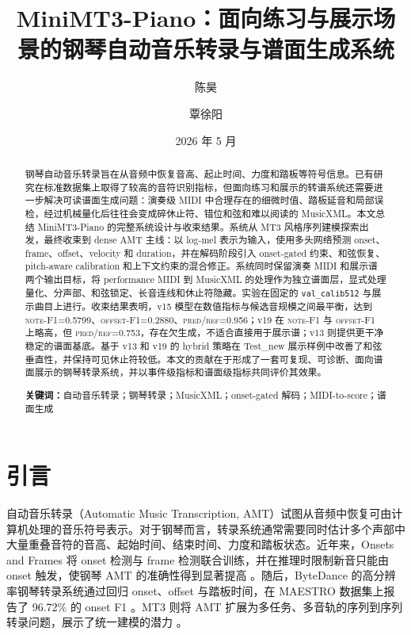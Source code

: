 \documentclass[UTF8,a4paper,zihao=-4]{ctexart}
\title{\textbf{MiniMT3-Piano：面向练习与展示场景的钢琴自动音乐转录与谱面生成系统}}
\author{陈昊 \and 覃徐阳}
\date{2026 年 5 月}
\newcommand{\code}[1]{\texttt{#1}}
\newcommand{\metric}[1]{\textsc{#1}}
\begin{document}
\maketitle

\begin{abstract}
钢琴自动音乐转录旨在从音频中恢复音高、起止时间、力度和踏板等符号信息。已有研究在标准数据集上取得了较高的音符识别指标，但面向练习和展示的转谱系统还需要进一步解决可读谱面生成问题：演奏级 MIDI 中合理存在的细微时值、踏板延音和局部误检，经过机械量化后往往会变成碎休止符、错位和弦和难以阅读的 MusicXML。本文总结 MiniMT3-Piano 的完整系统设计与收束结果。系统从 MT3 风格序列建模探索出发，最终收束到 dense AMT 主线：以 log-mel 表示为输入，使用多头网络预测 onset、frame、offset、velocity 和 duration，并在解码阶段引入 onset-gated 约束、和弦恢复、pitch-aware calibration 和上下文约束的混合修正。系统同时保留演奏 MIDI 和展示谱两个输出目标，将 performance MIDI 到 MusicXML 的处理作为独立谱面层，显式处理量化、分声部、和弦锁定、长音连线和休止符隐藏。实验在固定的 \code{val\_calib512} 与展示曲目上进行。收束结果表明，v15 模型在数值指标与候选音规模之间最平衡，达到 \metric{note-F1}=0.5799、\metric{offset-F1}=0.2880、\metric{pred/ref}=0.956；v19 在 \metric{note-F1} 与 \metric{offset-F1} 上略高，但 \metric{pred/ref}=0.753，存在欠生成，不适合直接用于展示谱；v13 则提供更干净稳定的谱面基底。基于 v13 和 v19 的 hybrid 策略在 Test\_new 展示样例中改善了和弦垂直性，并保持可见休止符较低。本文的贡献在于形成了一套可复现、可诊断、面向谱面展示的钢琴转录系统，并以事件级指标和谱面级指标共同评价其效果。

\noindent\textbf{关键词：}自动音乐转录；钢琴转录；MusicXML；onset-gated 解码；MIDI-to-score；谱面生成
\end{abstract}

\section{引言}

自动音乐转录（Automatic Music Transcription, AMT）试图从音频中恢复可由计算机处理的音乐符号表示。对于钢琴而言，转录系统通常需要同时估计多个声部中大量重叠音符的音高、起始时间、结束时间、力度和踏板状态。近年来，Onsets and Frames 将 onset 检测与 frame 检测联合训练，并在推理时限制新音只能由 onset 触发，使钢琴 AMT 的准确性得到显著提高 \cite{hawthorne2018onsets}。随后，ByteDance 的高分辨率钢琴转录系统通过回归 onset、offset 与踏板时间，在 MAESTRO 数据集上报告了 96.72\% 的 onset F1 \cite{kong2021highres}。MT3 则将 AMT 扩展为多任务、多音轨的序列到序列转录问题，展示了统一建模的潜力 \cite{gardner2022mt3}。
\end{document}
